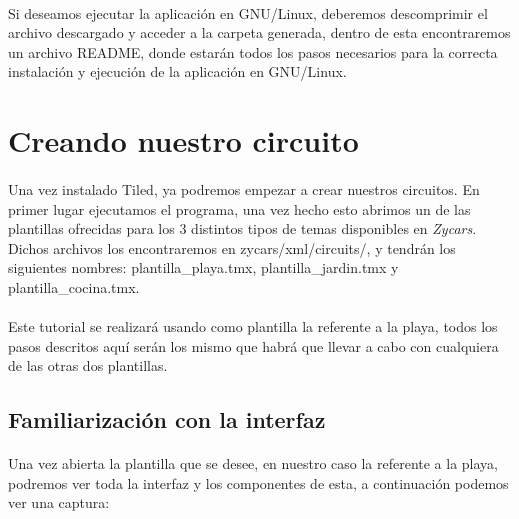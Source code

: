 \paragraph{}
Si deseamos ejecutar la aplicación en GNU/Linux, deberemos descomprimir el archivo descargado y acceder a la carpeta generada, 
dentro de esta encontraremos un archivo README, donde estarán todos los pasos necesarios para la correcta instalación y ejecución
de la aplicación en GNU/Linux.

\section{Creando nuestro circuito}

\paragraph{}
Una vez instalado Tiled, ya podremos empezar a crear nuestros circuitos. En primer lugar ejecutamos el programa, una vez hecho esto
abrimos un de las plantillas ofrecidas para los 3 distintos tipos de temas disponibles en \emph{Zycars}. Dichos archivos los 
encontraremos en zycars/xml/circuits/, y tendrán los siguientes nombres: plantilla\_playa.tmx, plantilla\_jardin.tmx y 
plantilla\_cocina.tmx.

\paragraph{}
Este tutorial se realizará usando como plantilla la referente a la playa, todos los pasos descritos aquí serán los mismo que habrá 
que llevar a cabo con cualquiera de las otras dos plantillas.

\subsection{Familiarización con la interfaz}

\paragraph{}
Una vez abierta la plantilla que se desee, en nuestro caso la referente a la playa, podremos ver toda la interfaz y los componentes 
de esta, a continuación podemos ver una captura:

